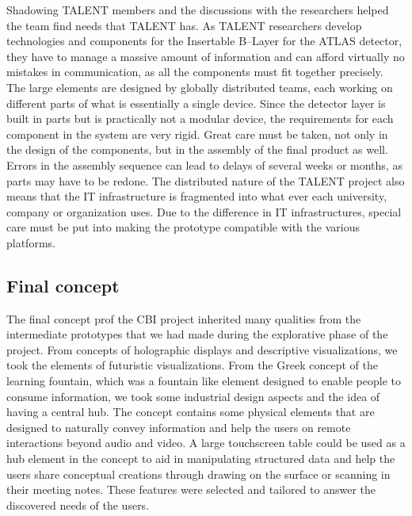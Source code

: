 \documentclass[english,12pt,a4paper,dvips]{article}
\begin{document}
Shadowing TALENT members and the discussions with the researchers helped the team find needs that TALENT has. As TALENT researchers develop technologies and components for the Insertable B--Layer for the ATLAS detector, they have to manage a massive amount of information and can afford virtually no mistakes in communication, as all the components must fit together precisely. The large elements are designed by globally distributed teams, each working on different parts of what is essentially a single device. Since the detector layer is built in parts but is practically not a modular device, the requirements for each component in the system are very rigid. Great care must be taken, not only in the design of the components, but in the assembly of the final product as well. Errors in the assembly sequence can lead to delays of several weeks or months, as parts may have to be redone. The distributed nature of the TALENT project also means that the IT infrastructure is fragmented into what ever each university, company or organization uses. Due to the difference in IT infrastructures, special care must be put into making the prototype compatible with the various platforms. 



\subsection{Final concept}


The final concept prof the CBI project inherited many qualities from the intermediate prototypes that we had made during the explorative phase of the project. From concepts of holographic displays and descriptive visualizations, we took the elements of futuristic visualizations. From the Greek concept of the learning fountain, which was a fountain like element designed to enable people to consume information, we took some industrial design aspects and the idea of having a central hub. The concept contains some physical elements that are designed to naturally convey information and help the users on remote interactions beyond audio and video. A large touchscreen table could be used as a hub element in the concept to aid in manipulating structured data and help the users share conceptual creations through drawing on the surface or scanning in their meeting notes. These features were selected and tailored to answer the discovered needs of the users.
\end{document}
